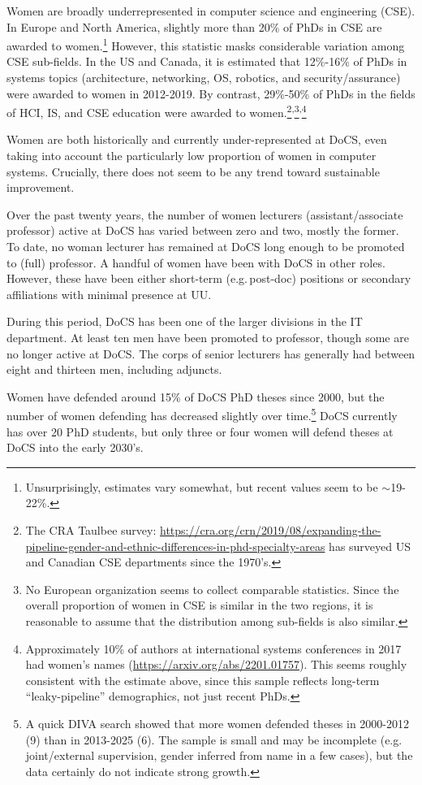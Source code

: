 \documentclass[a4paper,10pt,twocolumn]{article}
\begin{document}
Women are broadly underrepresented in computer science and engineering
(CSE). In Europe and North America, slightly more than 20\% of PhDs in
CSE are awarded to women.\footnote{Unsurprisingly, estimates vary
somewhat, but recent values seem to be $\sim$19-22\%.}  However, this
statistic masks considerable variation among CSE sub-fields.  In the
US and Canada, it is estimated that 12\%-16\% of PhDs in systems
topics (architecture, networking, OS, robotics, and
security/assurance) were awarded to women in 2012-2019.  By contrast,
29\%-50\% of PhDs in the fields of HCI, IS, and CSE education were
awarded to women.\footnote{The CRA Taulbee survey:
\url{https://cra.org/crn/2019/08/expanding-the-
 pipeline-gender-and-ethnic-differences-in-phd-specialty-areas} has
surveyed US and Canadian CSE departments since the
1970's.}\textsuperscript{,}\footnote{No European organization seems to
collect comparable statistics.  Since the overall proportion of women
in CSE is similar in the two regions, it is reasonable to assume that
the distribution among sub-fields is also
similar.}\textsuperscript{,}\footnote{Approximately 10\% of authors at
international systems conferences in 2017 had women's names
(\url{https://arxiv.org/abs/2201.01757}).  This seems roughly
consistent with the estimate above, since this sample reflects
long-term ``leaky-pipeline'' demographics, not just recent PhDs.}

Women are both historically and currently under-represented at DoCS,
even taking into account the particularly low proportion of women in
computer systems.  Crucially, there does not seem to be any trend
toward sustainable improvement.

Over the past twenty years, the number of women lecturers
(assistant/associate professor) active at DoCS has varied between zero
and two, mostly the former.  To date, no woman lecturer has remained
at DoCS long enough to be promoted to (full) professor.  A handful of
women have been with DoCS in other roles. However, these have been
either short-term (e.g.\,post-doc) positions or secondary affiliations
with minimal presence at UU.
  
During this period, DoCS has been one of the larger divisions in the
IT department.  At least ten men have been promoted to professor,
though some are no longer active at DoCS.  The corps of senior
lecturers has generally had between eight and thirteen men, including
adjuncts.

Women have defended around 15\% of DoCS PhD theses since 2000, but the
number of women defending has decreased slightly over time.\footnote{A
quick DIVA search showed that more women defended theses in 2000-2012
(9) than in 2013-2025 (6). The sample is small and may be incomplete
(e.g.\,joint/external supervision, gender inferred from name in a few
cases), but the data certainly do not indicate strong growth.}  DoCS
currently has over 20 PhD students, but only three or four women will
defend theses at DoCS into the early 2030's.
\end{document}
